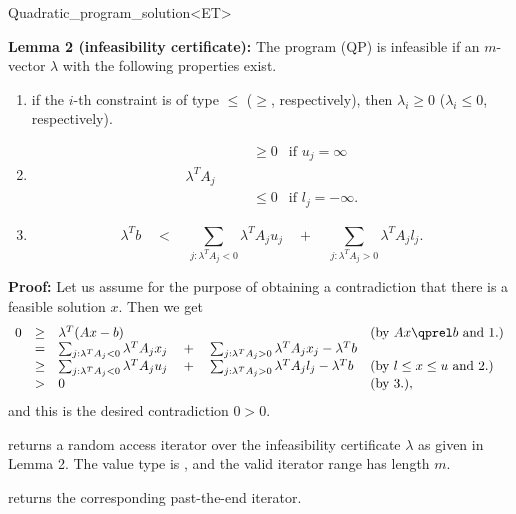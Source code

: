 \begin{ccRefClass}{Quadratic_program_solution<ET>}
\begin{ccAdvanced}
{\bf Lemma 2 (infeasibility certificate):} The program (QP) is
infeasible if an $m$-vector $\lambda$ with the
following properties exist.
\begin{enumerate}
\item if the $i$-th constraint is of type $\leq$ ($\geq$, respectively), 
then $\lambda_i\geq 0$ ($\lambda_i\leq 0$, respectively).
\item 
\[
\begin{array}{llll}
&&\geq 0 & \mbox{if $u_j=\infty$} \\
\lambda^T A_j &\quad  \\
&&\leq 0 & \mbox{if $l_j=-\infty$.}
\end{array}
\]
\item \[\lambda^Tb \quad<\quad \sum_{j: \lambda^TA_j <0} \lambda^TA_j u_j 
\quad+\quad  \sum_{j: \lambda^TA_j >0} \lambda^TA_j l_j.\]
\end{enumerate}

{\bf Proof:} Let us assume for the purpose of obtaining a contradiction
that there is a feasible solution $x$. Then we get
\[
\begin{array}{lcll}
0 &\geq& \lambda^T(Ax -b) &  \mbox{(by $Ax\qprel b$ and 1.)} \\
  &=& \sum_{j: \lambda^TA_j <0} \lambda^TA_j x_j 
\quad+\quad  \sum_{j: \lambda^TA_j >0} \lambda^TA_j x_j - \lambda^T b \\
  &\geq& \sum_{j: \lambda^TA_j <0} \lambda^TA_j u_j 
\quad+\quad  \sum_{j: \lambda^TA_j >0} \lambda^TA_j l_j - \lambda^T b &
\mbox{(by $l\leq x \leq u$ and 2.)} \\
  &>& 0 & \mbox{(by 3.)}, 
\end{array}
\]
and this is the desired contradiction $0>0$.


{returns a random access iterator over the infeasibility certificate 
$\lambda$ as given in Lemma 2. The value type
is , and the valid iterator range has length $m$.
\ccPrecond \ccVar{}}

{returns the corresponding past-the-end iterator.}

\ccExample
{}


\end{ccAdvanced}
\end{ccRefClass}
